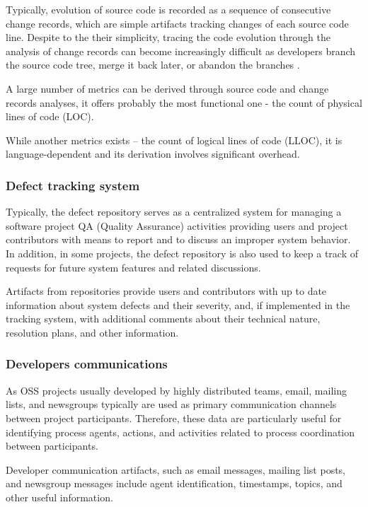 Typically, evolution of source code is recorded as a sequence of consecutive change records, which are simple artifacts 
tracking changes of each source code line. Despite to the their simplicity, tracing the code evolution through the analysis 
of change records can become increasingly difficult as developers branch the source code tree, merge it back later, 
or abandon the branches \cite{citeulike:13156191}.

A large number of metrics can be derived through source code and change records analyses, it offers probably the most functional one - the count of physical 
lines of code (LOC). 

While another metrics exists -- the count of logical lines of code (LLOC), it is language-dependent and its derivation involves 
significant overhead.


\subsubsection{Defect tracking system}
Typically, the defect repository serves as a centralized system for managing a software project QA (Quality Assurance) activities
providing users and project contributors with means to report and to discuss an improper system behavior.
In addition, in some projects, the defect repository is also used to keep a track of requests for future system features and related
discussions.

Artifacts from repositories provide users and contributors with up to date information about system defects and their severity, and, 
if implemented in the tracking system, with additional comments about their technical nature, resolution plans, and other information. 

\subsubsection{Developers communications}
As OSS projects usually developed by highly distributed teams, email, mailing lists, and newsgroups typically are 
used as primary communication channels between project participants. Therefore, these data are particularly useful for
identifying process agents, actions,  and activities related to process coordination between participants. 

Developer communication artifacts, such as email messages, mailing list posts, and newsgroup messages include agent identification, 
timestamps, topics, and other useful information. 

